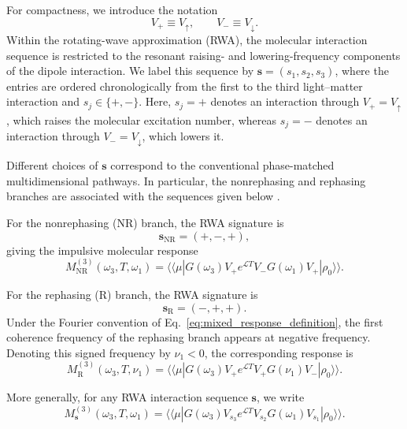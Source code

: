 For compactness, we introduce the notation
%
\begin{equation}
V_{+}
\equiv
V_{\uparrow},
\qquad
V_{-}
\equiv
V_{\downarrow}.
\label{eq:V_pm}
\end{equation}
%
Within the rotating-wave approximation (RWA), the molecular interaction
sequence is restricted to the resonant raising- and lowering-frequency
components of the dipole interaction. We label this sequence by
$\mathbf{s}=(s_1,s_2,s_3)$, where the entries are ordered chronologically
from the first to the third light--matter interaction and
$s_j\in\{+,-\}$. Here, $s_j=+$ denotes an interaction through
$V_{+}=V_{\uparrow}$, which raises the molecular excitation number,
whereas $s_j=-$ denotes an interaction through
$V_{-}=V_{\downarrow}$, which lowers it.

Different choices of $\mathbf{s}$ correspond to the conventional
phase-matched multidimensional pathways. In particular, the
nonrephasing and rephasing branches are associated with the sequences
given below
\cite{
Hybl1998TwoDimensional,
Abramavicius2009CoherentMultidimensional}.

For the nonrephasing (NR) branch, the RWA signature is
%
\begin{equation}
\mathbf{s}_{\mathrm{NR}}
=
(+,-,+),
\label{eq:NR_signature}
\end{equation}
%
giving the impulsive molecular response
%
\begin{equation}
M_{\mathrm{NR}}^{(3)}
(\omega_3,T,\omega_1)
=
\langle\!\langle\mu|
G(\omega_3)
V_{+}
e^{\mathcal{L}T}
V_{-}
G(\omega_1)
V_{+}
|\rho_0\rangle\!\rangle .
\label{eq:NR_impulsive_rwa}
\end{equation}

For the rephasing (R) branch, the RWA signature is
%
\begin{equation}
\mathbf{s}_{\mathrm{R}}
=
(-,+,+).
\label{eq:R_signature}
\end{equation}
%
Under the Fourier convention of
Eq.~\eqref{eq:mixed_response_definition}, the first coherence frequency
of the rephasing branch appears at negative frequency. Denoting this
signed frequency by $\nu_1<0$, the corresponding response is
%
\begin{equation}
M_{\mathrm{R}}^{(3)}
(\omega_3,T,\nu_1)
=
\langle\!\langle\mu|
G(\omega_3)
V_{+}
e^{\mathcal{L}T}
V_{+}
G(\nu_1)
V_{-}
|\rho_0\rangle\!\rangle .
\label{eq:R_impulsive_rwa}
\end{equation}

More generally, for any RWA interaction sequence $\mathbf{s}$, we write
%
\begin{equation}
M_{\mathbf{s}}^{(3)}
(\omega_3,T,\omega_1)
=
\langle\!\langle\mu|
G(\omega_3)
V_{s_3}
e^{\mathcal{L}T}
V_{s_2}
G(\omega_1)
V_{s_1}
|\rho_0\rangle\!\rangle .
\label{eq:general_impulsive_rwa}
\end{equation}

